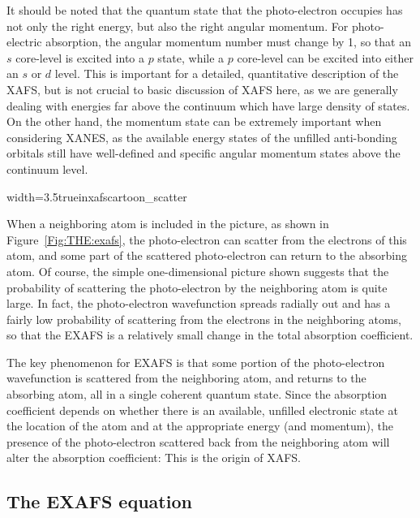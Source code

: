 It should be noted that the quantum state that the photo-electron occupies
has not only the right energy, but also the right angular momentum.  For
photo-electric absorption, the angular momentum number must change by 1, so
that an $s$ core-level is excited into a $p$ state, while a $p$ core-level
can be excited into either an $s$ or $d$ level.  This is important for a
detailed, quantitative description of the XAFS, but is not crucial to basic
discussion of XAFS here, as we are generally dealing with energies far
above the continuum which have large density of states.  On the other hand,
the momentum state can be extremely important when considering XANES, as
the available energy states of the unfilled anti-bonding orbitals still
have well-defined and specific angular momentum states above the continuum
level.

\begin{Nfig}{width=3.5truein}{xafscartoon_scatter}
  \caption{The photo-electron can scatter from a neighboring atom and
    return to the absorbing atom.  This modulates the amplitude of the
    photo-electron wave-function at the absorbing atom, and also modulates
    the absorption coefficient $\mu(E)$.}
  \label{Fig:THE:exafs}
\end{Nfig}

When a neighboring atom is included in the picture, as shown in
Figure~\ref{Fig:THE:exafs}, the photo-electron can scatter from the
electrons of this atom, and some part of the scattered photo-electron can
return to the absorbing atom.  Of course, the simple one-dimensional
picture shown suggests that the probability of scattering the
photo-electron by the neighboring atom is quite large.  In fact, the
photo-electron wavefunction spreads radially out and has a fairly low
probability of scattering from the electrons in the neighboring atoms, so
that the EXAFS is a relatively small change in the total absorption
coefficient.

The key phenomenon for EXAFS is that some portion of the photo-electron
wavefunction is scattered from the neighboring atom, and returns to the
absorbing atom, all in a single coherent quantum state.  Since the
absorption coefficient depends on whether there is an available, unfilled
electronic state at the location of the atom and at the appropriate energy
(and momentum), the presence of the photo-electron scattered back from the
neighboring atom will alter the absorption coefficient:  This is the origin
of XAFS.

\subsection{The EXAFS equation}


